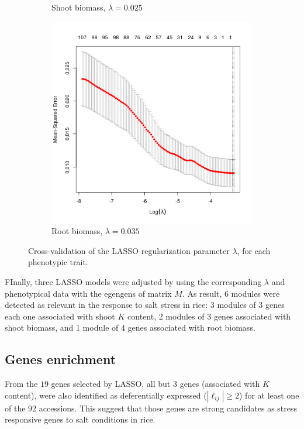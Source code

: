 \documentclass[12pt,journal, onecolumn]{IEEEtran}
\begin{document}
\begin{figure}[h]
\begin{subfigure}{0.3\linewidth}
     \caption{Shoot biomass, $\lambda = 0.025$}\label{fig:lambda_BMshoot}
   \end{subfigure}
   \begin{subfigure}{0.3\linewidth} \centering
     \includegraphics[width=1\textwidth]{Figures/lambda_BMroot.png}
     \caption{Root biomass, $\lambda = 0.035$}\label{fig:lambda_BMroot}
   \end{subfigure}
\caption{Cross-validation of the LASSO regularization parameter $\lambda$, for each phenotypic trait.} \label{fig:cross-val}
\end{figure}

FInally, three LASSO models were adjusted by using the corresponding $\lambda$ and phenotypical data with the egengens of matrix $M$. As result, 6 modules were detected as relevant in the response to salt stress in rice: 3 modules of 3 genes each one associated with shoot $K$ content, 2 modules of 3 genes associated with  shoot biomass, and 1 module of 4 genes associated with root biomass.\\

\subsection{Genes enrichment}
From the $19$ genes selected by LASSO, all but $3$ genes (associated with $K$ content), were also identified as deferentially expressed ($|\ell_{ij}| \geq 2$) for at least one of the $92$ accessions. This suggest that those genes are strong candidates as stress responsive genes to salt conditions in rice.\\
\end{document}
